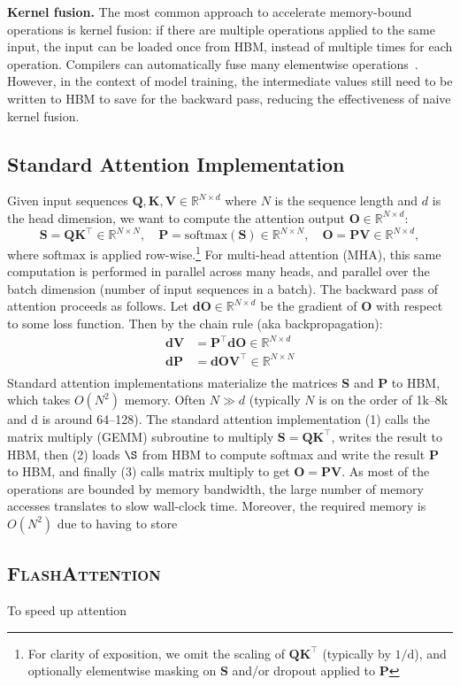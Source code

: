 \message{ !name(../flash2.tex)}\documentclass{article}
\newcommand{\softmax}{\mathrm{softmax}}
\newcommand{\vQ}{\mathbf{Q}}
\newcommand{\vK}{\mathbf{K}}
\newcommand{\vV}{\mathbf{V}}
\newcommand{\vdV}{\mathbf{dV}}
\newcommand{\vS}{\mathbf{S}}
\newcommand{\vP}{\mathbf{P}}
\newcommand{\vdP}{\mathbf{dP}}
\newcommand{\vO}{\mathbf{O}}
\newcommand{\vdO}{\mathbf{dO}}
\newcommand{\sysnameone}{\textsc{FlashAttention}\xspace}
\begin{document}
\textbf{Kernel fusion.}
The most common approach to accelerate memory-bound operations is
kernel fusion: if there are multiple operations applied to the same input,
the input can be loaded once from HBM, instead of multiple times for each operation.
Compilers can automatically fuse many elementwise operations~\citep{li2020deep, paszke2019pytorch, sabne2020xla}.
However, in the context of model training, the intermediate values still need
to be written to HBM to save for the backward pass, reducing the
effectiveness of naive kernel fusion.
\subsection{Standard Attention Implementation}
\label{subsec:standard_attn}
Given input sequences $\vQ, \vK, \vV \in \mathbb{R}^{N \times d}$ where $N$ is the sequence length and
$d$ is the head dimension, we want to compute the attention output $\vO \in \mathbb{R}^{N \times d}$:
\begin{equation*}
  \vS = \vQ \vK^\top \in \mathbb{R}^{N \times N}, \quad \vP = \softmax(\vS) \in \mathbb{R}^{N \times N}, \quad \vO = \vP\vV \in \mathbb{R}^{N \times d},
\end{equation*}
where $\softmax$ is applied row-wise.\footnote{For clarity of exposition, we
  omit the scaling of $\vQ \vK^\top$ (typically by $1/\mathrm{d}$), and optionally
  elementwise masking on $\vS$ and/or dropout applied to $\vP$} For multi-head
attention (MHA), this same computation is performed in parallel across many
heads, and parallel over the batch dimension (number of input sequences in a
batch).
The backward pass of attention proceeds as follows.
Let $\vdO \in \mathbb{R}^{N \times d}$ be the gradient of $\vO$ with respect to some loss
function. Then by the chain rule (aka backpropagation):
\begin{align*}
  \vdV &= \vP^\top \vdO \in \mathbb{R}^{N \times d} \\
  \vdP &= \vdO \vV^\top \in \mathbb{R}^{N \times N} \\
\end{align*}
Standard attention implementations materialize the matrices $\vS$ and $\vP$ to
HBM, which takes $O(N^2)$ memory.
Often $N \gg d$ (typically $N$ is on the order of 1k--8k and d is around 64--128).
The standard attention implementation (1) calls the matrix multiply (GEMM)
subroutine to multiply $\vS = \vQ \vK^\top$, writes the result to HBM, then (2) loads
$\S$ from HBM to compute softmax and write the result $\vP$ to HBM, and finally
(3) calls matrix multiply to get $\vO = \vP \vV$.
As most of the operations are bounded by memory bandwidth, the large number of
memory accesses translates to slow wall-clock time.
Moreover, the required memory is $O(N^2)$ due to having to store
\subsection{\sysnameone}
\label{subsec:flashv1}
To speed up attention
\end{document}

